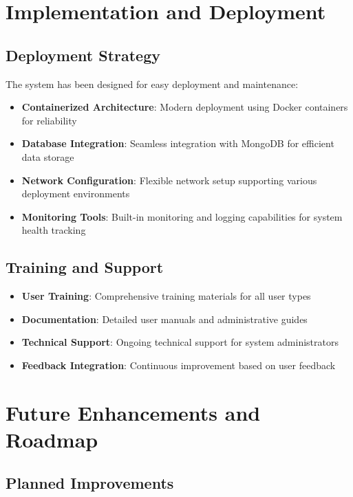 \documentclass[12pt,a4paper]{article}
\begin{document}
\section{Implementation and Deployment}

\subsection{Deployment Strategy}

The system has been designed for easy deployment and maintenance:

\begin{itemize}[leftmargin=2em]
    \item \textbf{Containerized Architecture}: Modern deployment using Docker containers for reliability
    \item \textbf{Database Integration}: Seamless integration with MongoDB for efficient data storage
    \item \textbf{Network Configuration}: Flexible network setup supporting various deployment environments
    \item \textbf{Monitoring Tools}: Built-in monitoring and logging capabilities for system health tracking
\end{itemize}

\subsection{Training and Support}

\begin{itemize}[leftmargin=2em]
    \item \textbf{User Training}: Comprehensive training materials for all user types
    \item \textbf{Documentation}: Detailed user manuals and administrative guides
    \item \textbf{Technical Support}: Ongoing technical support for system administrators
    \item \textbf{Feedback Integration}: Continuous improvement based on user feedback
\end{itemize}

\section{Future Enhancements and Roadmap}

\subsection{Planned Improvements}
\end{document}
